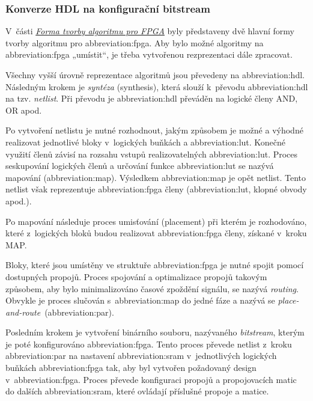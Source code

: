 \documentclass[a4paper, twoside, 11pt]{article}
\begin{document}
		\subsubsection{Konverze HDL na konfigurační bitstream}
			V~části \hyperref[subsubsec:forma-tvorby-algoritmu-pro-fpga]{\textit{Forma tvorby algoritmu pro FPGA}} byly představeny dvě hlavní formy tvorby algoritmu pro \gls{abbreviation:fpga}. Aby bylo možné algoritmy na \gls{abbreviation:fpga} „umístit“, je třeba vytvořenou rezprezentaci dále zpracovat.\par
			Všechny vyšší úrovně reprezentace algoritmů jsou převedeny na \gls{abbreviation:hdl}. Následným krokem je \textit{syntéza} (synthesis), která slouží k~převodu \gls{abbreviation:hdl} na tzv. \textit{netlist}. Při převodu je \gls{abbreviation:hdl} převáděn na logické členy AND, OR apod. \cite{Sass2010}\par
			Po vytvoření netlistu je nutné rozhodnout, jakým způsobem je možné a výhodné realizovat jednotlivé bloky v~logických buňkách a \gls{abbreviation:lut}. Konečné využití členů závisí na rozsahu vstupů realizovatelných \gls{abbreviation:lut}. Proces seskupování logických členů a určování funkce \gls{abbreviation:lut} se nazývá mapování (\gls{abbreviation:map}). Výsledkem \gls{abbreviation:map} je opět netlist. Tento netlist však reprezentuje \gls{abbreviation:fpga} členy (\gls{abbreviation:lut}, klopné obvody apod.). \cite{Sass2010}\par
			Po mapování následuje proces umisťování (placement) při kterém je rozhodováno, které z~logických bloků budou realizovat \gls{abbreviation:fpga} členy, získané v~kroku MAP. \cite{Sass2010}\par
			Bloky, které jsou umístěny ve struktuře \gls{abbreviation:fpga} je nutné spojit pomocí dostupných propojů. Proces spojování a optimalizace propojů takovým způsobem, aby bylo minimalizováno časové zpoždění signálu, se nazývá \textit{routing}. Obvykle je proces slučován s~\gls{abbreviation:map} do jedné fáze a nazývá se \textit{place-and-route}~(\gls{abbreviation:par}). \cite{Sass2010} \par
			Posledním krokem je vytvoření binárního souboru, nazývaného \textit{bitstream}, kterým je poté konfigurováno \gls{abbreviation:fpga}. Tento proces převede netlist z~kroku \gls{abbreviation:par} na nastavení \gls{abbreviation:sram} v~jednotlivých logických buňkách \gls{abbreviation:fpga} tak, aby byl vytvořen požadovaný design v~\gls{abbreviation:fpga}. Proces převede konfiguraci propojů a propojovacích matic do dalších \gls{abbreviation:sram}, které ovládají příslušné propoje a matice. \cite{Sass2010}\par
\end{document}
